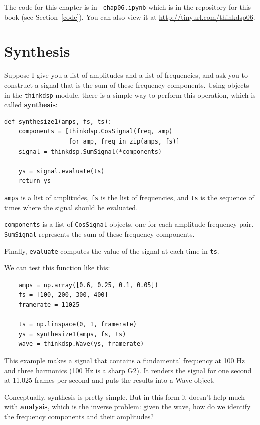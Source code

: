 \documentclass[12pt]{book}
\begin{document}
The code for this chapter is in {\tt
  chap06.ipynb} which is in the repository for this book (see
Section~\ref{code}).
You can also view it at \url{http://tinyurl.com/thinkdsp06}.


\section{Synthesis}
\label{synth1}

Suppose I give you a list of amplitudes and a list of frequencies,
and ask you to construct a signal that is the sum of these frequency
components.  Using objects in the {\tt thinkdsp} module, there is
a simple way to perform this operation, which is called {\bf synthesis}:

\begin{verbatim}
def synthesize1(amps, fs, ts):
    components = [thinkdsp.CosSignal(freq, amp)
                  for amp, freq in zip(amps, fs)]
    signal = thinkdsp.SumSignal(*components)

    ys = signal.evaluate(ts)
    return ys
\end{verbatim}

{\tt amps} is a list of amplitudes, {\tt fs} is the list
of frequencies, and {\tt ts} is the sequence
of times where the signal should be evaluated.

{\tt components} is a list of {\tt CosSignal} objects, one for
each amplitude-frequency pair.  {\tt SumSignal} represents the
sum of these frequency components.

Finally, {\tt evaluate} computes the value of the signal at each
time in {\tt ts}.

We can test this function like this:

\begin{verbatim}
    amps = np.array([0.6, 0.25, 0.1, 0.05])
    fs = [100, 200, 300, 400]
    framerate = 11025

    ts = np.linspace(0, 1, framerate)
    ys = synthesize1(amps, fs, ts)
    wave = thinkdsp.Wave(ys, framerate)
\end{verbatim}

This example makes a signal that contains a fundamental frequency at
100 Hz and three harmonics (100 Hz is a sharp G2).  It renders the
signal for one second at 11,025 frames per second and puts the results
into a Wave object.

Conceptually, synthesis is pretty simple.  But in this form it doesn't
help much with {\bf analysis}, which is the inverse problem: given the
wave, how do we identify the frequency components and their amplitudes?
\end{document}
